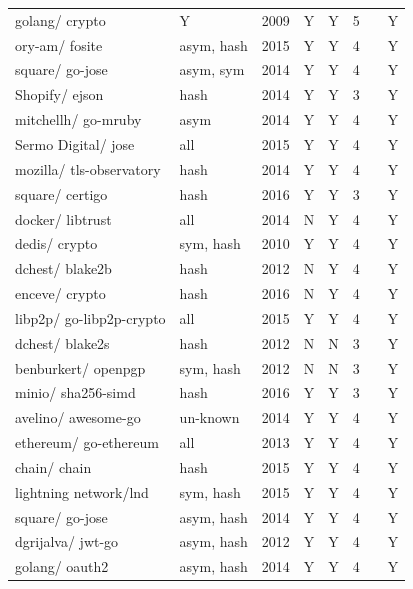 \documentclass[
  digital, %
  notable,   %
  lof,     %
  lot,     %
]{fithesis3}
\begin{document}
\begin{center}
\begin{longtable}[th]{|P{1.6cm}P{1cm}P{1cm}P{1cm}P{1.3cm}P{1.3cm}P{1.2cm}P{1.1cm}|}
golang/ crypto & Y & 2009 & Y & Y & 5 &  & Y\\ 
ory-am/ fosite & asym, hash & 2015 & Y & Y & 4 & & Y \\
square/ go-jose & asym, sym & 2014 & Y & Y & 4 & & Y \\
Shopify/ ejson & hash & 2014 & Y & Y & 3 & & Y \\
mitchellh/ go-mruby & asym & 2014 & Y & Y & 4 & & Y \\
Sermo Digital/ jose & all & 2015 & Y & Y & 4 &  & Y \\
mozilla/ tls-observatory & hash & 2014 & Y & Y & 4 & & Y \\
square/ certigo & hash & 2016 & Y & Y & 3 & & Y \\
docker/ libtrust & all & 2014 & N & Y & 4 & & Y \\
dedis/ crypto & sym, hash & 2010 & Y & Y & 4 & & Y \\
dchest/ blake2b & hash & 2012 & N & Y & 4 & & Y \\
enceve/ crypto & hash & 2016 & N & Y & 4 & & Y \\
libp2p/ go-libp2p-crypto & all & 2015 & Y & Y & 4 &  & Y \\ 
dchest/ blake2s & hash & 2012 & N & N & 3 & & Y \\
benburkert/ openpgp & sym, hash & 2012 & N & N & 3 & & Y \\
minio/ sha256-simd & hash & 2016 & Y & Y & 3 & & Y \\
avelino/ awesome-go & un-known & 2014 & Y & Y & 4 & & Y \\
ethereum/ go-ethereum & all & 2013 & Y & Y & 4 & & Y \\
chain/ chain & hash & 2015 & Y & Y & 4 & & Y \\
lightning network/lnd & sym, hash & 2015 & Y & Y & 4 & & Y \\
square/ go-jose & asym, hash & 2014 & Y & Y & 4 & & Y \\
dgrijalva/ jwt-go & asym, hash & 2012 & Y & Y & 4 & & Y \\
golang/ oauth2 & asym, hash & 2014 & Y & Y & 4 & & Y  
\end{longtable}
\end{center}


\printbibliography
\end{document}

